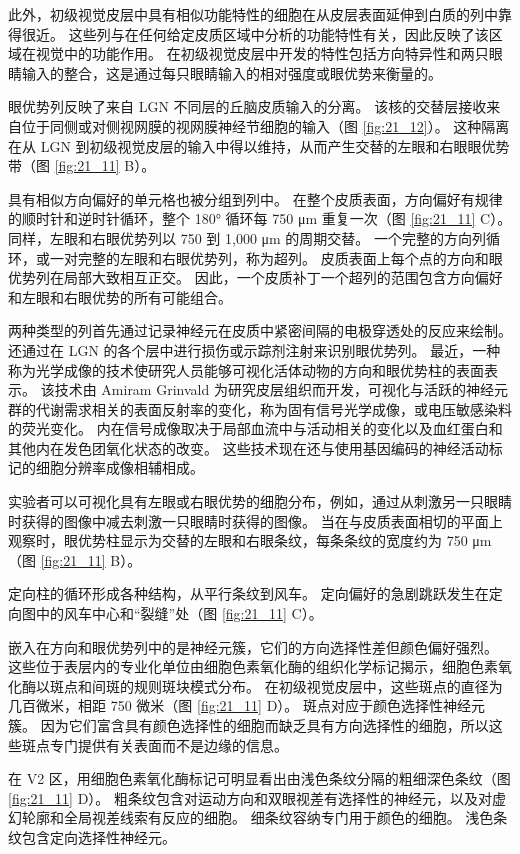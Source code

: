 此外，初级视觉皮层中具有相似功能特性的细胞在从皮层表面延伸到白质的列中靠得很近。 
这些列与在任何给定皮质区域中分析的功能特性有关，因此反映了该区域在视觉中的功能作用。 
在初级视觉皮层中开发的特性包括方向特异性和两只眼睛输入的整合，这是通过每只眼睛输入的相对强度或眼优势来衡量的。


眼优势列反映了来自 LGN 不同层的丘脑皮质输入的分离。 
该核的交替层接收来自位于同侧或对侧视网膜的视网膜神经节细胞的输入（图 \ref{fig:21_12}）。 
这种隔离在从 LGN 到初级视觉皮层的输入中得以维持，从而产生交替的左眼和右眼眼优势带（图 \ref{fig:21_11} B）。


具有相似方向偏好的单元格也被分组到列中。 
在整个皮质表面，方向偏好有规律的顺时针和逆时针循环，整个 180° 循环每 750 μm 重复一次（图 \ref{fig:21_11} C）。 
同样，左眼和右眼优势列以 750 到 1,000 μm 的周期交替。 
一个完整的方向列循环，或一对完整的左眼和右眼优势列，称为超列。 
皮质表面上每个点的方向和眼优势列在局部大致相互正交。 
因此，一个皮质补丁一个超列的范围包含方向偏好和左眼和右眼优势的所有可能组合。


两种类型的列首先通过记录神经元在皮质中紧密间隔的电极穿透处的反应来绘制。 
还通过在 LGN 的各个层中进行损伤或示踪剂注射来识别眼优势列。 
最近，一种称为光学成像的技术使研究人员能够可视化活体动物的方向和眼优势柱的表面表示。 
该技术由 Amiram Grinvald 为研究皮层组织而开发，可视化与活跃的神经元群的代谢需求相关的表面反射率的变化，称为固有信号光学成像，或电压敏感染料的荧光变化。 
内在信号成像取决于局部血流中与活动相关的变化以及血红蛋白和其他内在发色团氧化状态的改变。 
这些技术现在还与使用基因编码的神经活动标记的细胞分辨率成像相辅相成。


实验者可以可视化具有左眼或右眼优势的细胞分布，例如，通过从刺激另一只眼睛时获得的图像中减去刺激一只眼睛时获得的图像。 
当在与皮质表面相切的平面上观察时，眼优势柱显示为交替的左眼和右眼条纹，每条条纹的宽度约为 750 μm（图 \ref{fig:21_11} B）。


定向柱的循环形成各种结构，从平行条纹到风车。 
定向偏好的急剧跳跃发生在定向图中的风车中心和“裂缝”处（图 \ref{fig:21_11} C）。


嵌入在方向和眼优势列中的是神经元簇，它们的方向选择性差但颜色偏好强烈。 
这些位于表层内的专业化单位由细胞色素氧化酶的组织化学标记揭示，细胞色素氧化酶以斑点和间斑的规则斑块模式分布。 
在初级视觉皮层中，这些斑点的直径为几百微米，相距 750 微米（图 \ref{fig:21_11} D）。
斑点对应于颜色选择性神经元簇。 
因为它们富含具有颜色选择性的细胞而缺乏具有方向选择性的细胞，所以这些斑点专门提供有关表面而不是边缘的信息。


在 V2 区，用细胞色素氧化酶标记可明显看出由浅色条纹分隔的粗细深色条纹（图 \ref{fig:21_11} D）。 
粗条纹包含对运动方向和双眼视差有选择性的神经元，以及对虚幻轮廓和全局视差线索有反应的细胞。 
细条纹容纳专门用于颜色的细胞。 
浅色条纹包含定向选择性神经元。


